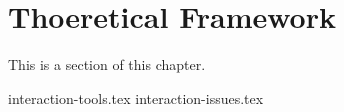 
\section{Thoeretical Framework}
This is a section of this chapter.

{interaction-tools.tex}
{interaction-issues.tex}
